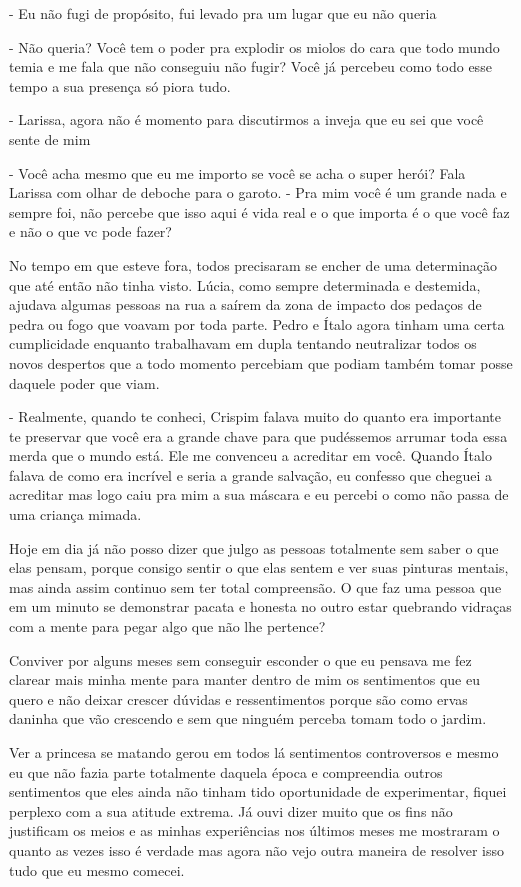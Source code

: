 - Eu não fugi de propósito, fui levado pra um lugar que eu não queria

- Não queria? Você tem o poder pra explodir os miolos do cara que todo mundo temia e me fala que não conseguiu não fugir? Você já percebeu como todo esse tempo a sua presença só piora tudo.

- Larissa, agora não é momento para discutirmos a inveja que eu sei que você sente de mim

- Você acha mesmo que eu me importo se você se acha o super herói? Fala Larissa com olhar de deboche para o garoto. - Pra mim você é um grande nada e sempre foi, não percebe que isso aqui é vida real e o que importa é o que você faz e não o que vc pode fazer?

No tempo em que esteve fora, todos precisaram se encher de uma determinação que até então não tinha visto. Lúcia, como sempre determinada e destemida, ajudava algumas pessoas na rua a saírem da zona de impacto dos pedaços de pedra ou fogo que voavam por toda parte. Pedro e Ítalo agora tinham uma certa cumplicidade enquanto trabalhavam em dupla tentando neutralizar todos os novos despertos que a todo momento percebiam que podiam também tomar posse daquele poder que viam. 

- Realmente, quando te conheci, Crispim falava muito do quanto era importante te preservar que você era a grande chave para que pudéssemos arrumar toda essa merda que o mundo está. Ele me convenceu a acreditar em você. Quando Ítalo falava de como era incrível e seria a grande salvação, eu confesso que cheguei a acreditar mas logo caiu pra mim a sua máscara e eu percebi o como não passa de uma criança mimada.

Hoje em dia já não posso dizer que julgo as pessoas totalmente sem saber o que elas pensam, porque consigo sentir o que elas sentem e ver suas pinturas mentais, mas ainda assim continuo sem ter total compreensão. O que faz uma pessoa que em um minuto se demonstrar pacata e honesta no outro estar quebrando vidraças com a mente para pegar algo que não lhe pertence?

Conviver por alguns meses sem conseguir esconder o que eu pensava me fez clarear mais minha mente para manter dentro de mim os sentimentos que eu quero e não deixar crescer dúvidas e ressentimentos porque são como ervas daninha que vão crescendo e sem que ninguém perceba tomam todo o jardim.

Ver a princesa se matando gerou em todos lá sentimentos controversos e mesmo eu que não fazia parte totalmente daquela época e compreendia outros sentimentos que eles ainda não tinham tido oportunidade de experimentar, fiquei perplexo com a sua atitude extrema. Já ouvi dizer muito que os fins não justificam os meios e as minhas experiências nos últimos meses me mostraram o quanto as vezes isso é verdade mas agora não vejo outra maneira de resolver isso tudo que eu mesmo comecei.

